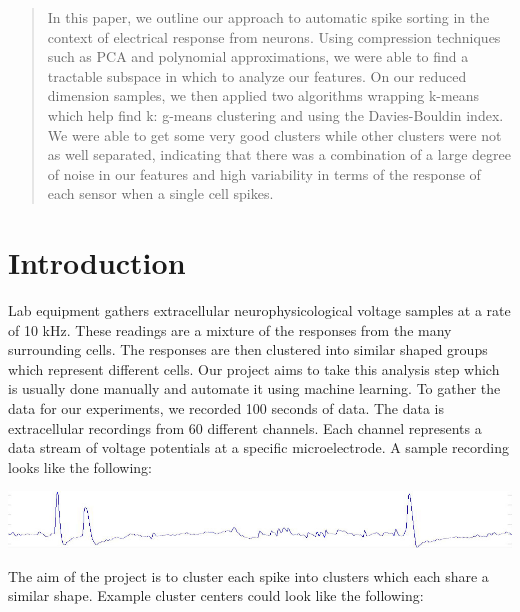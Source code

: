 \documentclass[conference]{IEEEtran}
\begin{document}
\maketitle
\begin{abstract}
In this paper, we outline our approach to automatic spike sorting in the
context of electrical response from neurons. Using compression techniques
such as PCA and polynomial approximations, we were able to find a
tractable subspace in which to analyze our features. On our reduced
dimension samples, we then applied two algorithms wrapping k-means which
help find k: g-means clustering and using the Davies-Bouldin index. We
were able to get some 
very good clusters while other clusters were not as well separated,
indicating that there was a combination of a large degree of noise in our
features and high variability in terms of the response of each sensor when
a single cell spikes.

\end{abstract}

\section{Introduction}

Lab equipment gathers extracellular neurophysicological voltage samples at
a rate of 10 kHz. These readings are a mixture of the responses from the
many surrounding cells. The responses are then clustered into
similar shaped groups which represent different cells. Our
project aims to take this analysis step which is usually done
manually and automate it using machine learning. To gather the data for
our experiments, we recorded 100 seconds of data. The data is
extracellular recordings from 60 different channels. Each channel 
represents a data stream of voltage potentials at a specific microelectrode. A sample
recording looks like the following:

\begin{center}
  \includegraphics[width=0.8\linewidth]{../poster/images/voltagetrace_2_small.jpg}
\end{center}

The aim of the project is to cluster each spike into clusters
which each share a similar shape.  Example cluster centers
could look like the following:
\end{document}
